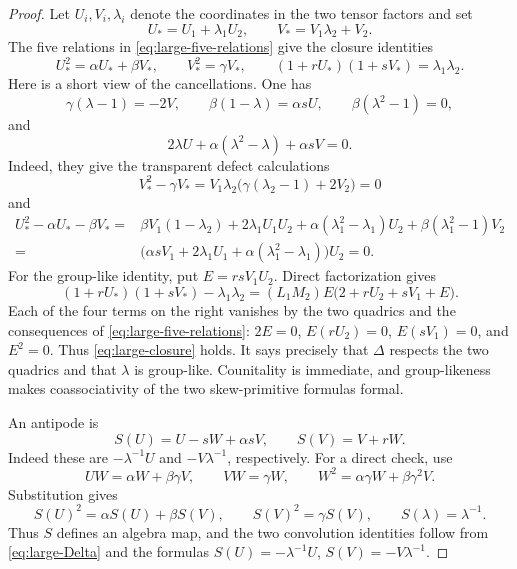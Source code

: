 \documentclass[11pt]{article}
\theoremstyle{remark}
\begin{document}
\begin{proof}
Let $U_i,V_i,\lambda_i$ denote the coordinates in the two tensor factors and
set
\[
 U_*=U_1+\lambda_1U_2,
 \qquad
 V_*=V_1\lambda_2+V_2.
\]
The five relations in \eqref{eq:large-five-relations} give the closure
identities
\begin{equation}\label{eq:large-closure}
 U_*^2=\alpha U_*+\beta V_*,
 \qquad
 V_*^2=\gamma V_*,
 \qquad
 (1+rU_*)(1+sV_*)=\lambda_1\lambda_2.
\end{equation}
Here is a short view of the cancellations.  One has
\[
 \gamma(\lambda-1)=-2V,\qquad
 \beta(1-\lambda)=\alpha sU,\qquad
 \beta(\lambda^2-1)=0,
\]
and
\[
 2\lambda U+\alpha(\lambda^2-\lambda)+\alpha sV=0.
\]
Indeed, they give the transparent defect calculations
\[
 V_*^2-\gamma V_*
 =V_1\lambda_2\bigl(\gamma(\lambda_2-1)+2V_2\bigr)=0
\]
and
\begin{align*}
 U_*^2-\alpha U_*-\beta V_*
  ={}&\beta V_1(1-\lambda_2)+2\lambda_1U_1U_2
      +\alpha(\lambda_1^2-\lambda_1)U_2
      +\beta(\lambda_1^2-1)V_2\\
  ={}&\bigl(\alpha sV_1+2\lambda_1U_1
      +\alpha(\lambda_1^2-\lambda_1)\bigr)U_2=0.
\end{align*}
For the group-like identity, put
$E=rsV_1U_2$.  Direct factorization gives
\begin{equation}\label{eq:large-group-like-factor}
 (1+rU_*)(1+sV_*)-\lambda_1\lambda_2
  =(L_1M_2)E\bigl(2+rU_2+sV_1+E\bigr).
\end{equation}
Each of the four terms on the right vanishes by the two quadrics and the
consequences of \eqref{eq:large-five-relations}: $2E=0$,
$E(rU_2)=0$, $E(sV_1)=0$, and $E^2=0$.
Thus \eqref{eq:large-closure} holds.  It says precisely that $\Delta$
respects the two quadrics and that $\lambda$ is group-like.  Counitality is
immediate, and group-likeness makes coassociativity of the two skew-primitive
formulas formal.

An antipode is
\begin{equation}\label{eq:large-antipode}
 S(U)=U-sW+\alpha sV,
 \qquad
 S(V)=V+rW.
\end{equation}
Indeed these are $-\lambda^{-1}U$ and $-V\lambda^{-1}$, respectively.
For a direct check, use
\[
 UW=\alpha W+\beta\gamma V,\qquad
 VW=\gamma W,\qquad
 W^2=\alpha\gamma W+\beta\gamma^2V.
\]
Substitution gives
\[
 S(U)^2=\alpha S(U)+\beta S(V),\qquad
 S(V)^2=\gamma S(V),\qquad S(\lambda)=\lambda^{-1}.
\]
Thus $S$ defines an algebra map, and the two convolution identities follow
from \eqref{eq:large-Delta} and the formulas
$S(U)=-\lambda^{-1}U$, $S(V)=-V\lambda^{-1}$.


\end{proof}
\end{document}
